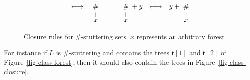 \documentclass{CSML}
\newcommand\tree{\boldsymbol{t}}
\newcommand{\toto}{\longleftrightarrow}
\begin{document}
\begin{figure}[h!]
\[\begin{array}{rclcrclcrclrclc}
&
\vspace{-0mm}\toto
&
\begin{minipage}[t]{5mm}
\vspace{-3.5mm}
\begin{tikzpicture}
  [level distance=7mm,
   level 1/.style={sibling distance=10mm},
   level 2/.style={sibling distance=5mm}]
\node {$\#$}
 child { node {$x$} };
\end{tikzpicture}
\end{minipage}
& \quad &
\begin{minipage}[t]{5mm}
\vspace{-3.5mm}
\begin{tikzpicture}
  [level distance=7mm,
   level 1/.style={sibling distance=10mm},
   level 2/.style={sibling distance=5mm}]
\node {$\#$}
 child { node {$x$} };
\end{tikzpicture}
\end{minipage}
+ y
&
\vspace{-0mm}\toto
&
y +
\begin{minipage}[t]{5mm}
\vspace{-3.5mm}
\begin{tikzpicture}
  [level distance=7mm,
   level 1/.style={sibling distance=10mm},
   level 2/.style={sibling distance=5mm}]
\node {$\#$}
 child { node {$x$} };
\end{tikzpicture}
\end{minipage}
\end{array}
\]
\caption{Closure rules for $\#$-stuttering sets. $x$ represents an arbitrary forest.}
\label{fig-rules}
\end{figure}

For instance if $L$ is $\#$-stuttering and contains the trees $\tree[1]$ and
$\tree[2]$ of Figure~\ref{fig-class-forest}, then it should also contain the
trees in Figure~\ref{fig-class-closure}.
\end{document}
